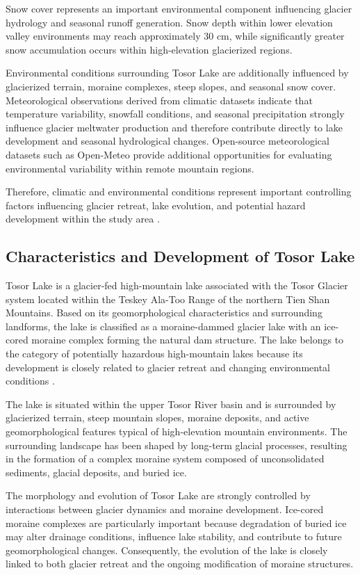 \documentclass[12pt,a4paper]{report}
\begin{document}
Snow cover represents an important environmental component influencing glacier hydrology and seasonal runoff generation. Snow depth within lower elevation valley environments may reach approximately 30 cm, while significantly greater snow accumulation occurs within high-elevation glacierized regions. 

Environmental conditions surrounding Tosor Lake are additionally influenced by glacierized terrain, moraine complexes, steep slopes, and seasonal snow cover. Meteorological observations derived from climatic datasets indicate that temperature variability, snowfall conditions, and seasonal precipitation strongly influence glacier meltwater production and therefore contribute directly to lake development and seasonal hydrological changes. Open-source meteorological datasets such as Open-Meteo provide additional opportunities for evaluating environmental variability within remote mountain regions. 

Therefore, climatic and environmental conditions represent important controlling factors influencing glacier retreat, lake evolution, and potential hazard development within the study area \cite{Sorg2012, Aizen2006}.

\subsection{Characteristics and Development of Tosor Lake}

Tosor Lake is a glacier-fed high-mountain lake associated with the Tosor Glacier system located within the Teskey Ala-Too Range of the northern Tien Shan Mountains. Based on its geomorphological characteristics and surrounding landforms, the lake is classified as a moraine-dammed glacier lake with an ice-cored moraine complex forming the natural dam structure. The lake belongs to the category of potentially hazardous high-mountain lakes because its development is closely related to glacier retreat and changing environmental conditions \cite{MESKR2024}. 

The lake is situated within the upper Tosor River basin and is surrounded by glacierized terrain, steep mountain slopes, moraine deposits, and active geomorphological features typical of high-elevation mountain environments. The surrounding landscape has been shaped by long-term glacial processes, resulting in the formation of a complex moraine system composed of unconsolidated sediments, glacial deposits, and buried ice. 

The morphology and evolution of Tosor Lake are strongly controlled by interactions between glacier dynamics and moraine development. Ice-cored moraine complexes are particularly important because degradation of buried ice may alter drainage conditions, influence lake stability, and contribute to future geomorphological changes. Consequently, the evolution of the lake is closely linked to both glacier retreat and the ongoing modification of moraine structures. 
\end{document}
